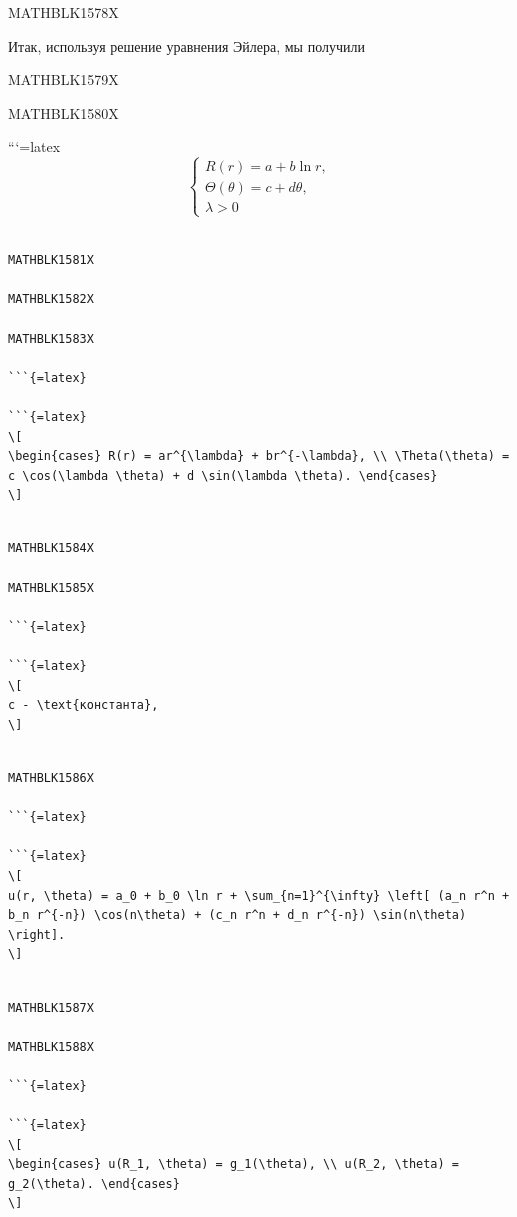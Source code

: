 \documentclass[
]{article}
\begin{document}
MATHBLK1578X

Итак, используя решение уравнения Эйлера, мы получили

MATHBLK1579X

MATHBLK1580X

```{=latex}
\[
\begin{cases} R(r) = a + b \ln r, \\ \Theta(\theta) = c + d\theta, \\ \lambda > 0 \end{cases}
\]

\begin{verbatim}

MATHBLK1581X

MATHBLK1582X

MATHBLK1583X

```{=latex}

```{=latex}
\[
\begin{cases} R(r) = ar^{\lambda} + br^{-\lambda}, \\ \Theta(\theta) = c \cos(\lambda \theta) + d \sin(\lambda \theta). \end{cases}
\]
\end{verbatim}

\begin{verbatim}

MATHBLK1584X

MATHBLK1585X

```{=latex}

```{=latex}
\[
c - \text{константа},
\]
\end{verbatim}

\begin{verbatim}

MATHBLK1586X

```{=latex}

```{=latex}
\[
u(r, \theta) = a_0 + b_0 \ln r + \sum_{n=1}^{\infty} \left[ (a_n r^n + b_n r^{-n}) \cos(n\theta) + (c_n r^n + d_n r^{-n}) \sin(n\theta) \right].
\]
\end{verbatim}

\begin{verbatim}

MATHBLK1587X

MATHBLK1588X

```{=latex}

```{=latex}
\[
\begin{cases} u(R_1, \theta) = g_1(\theta), \\ u(R_2, \theta) = g_2(\theta). \end{cases}
\]
\end{verbatim}
\end{document}
